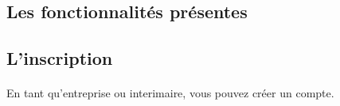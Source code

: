 \documentclass[a4paper]{article}
\begin{document}
    \newpage
    \begin{multicols}{2}
        \section{Les fonctionnalités présentes}
        \subsection{L'inscription}
        \paragraph{}
        En tant qu'entreprise ou interimaire, vous pouvez créer un compte. 
        

\end{multicols}
\end{document}
